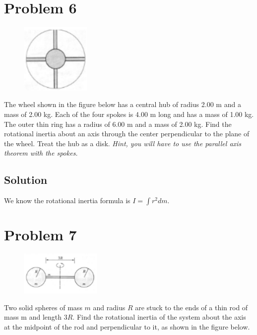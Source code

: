 \documentclass[12pt]{article}
\begin{document}
\section*{Problem 6}
\begin{figure}
    \vspace{-30pt}
    \includegraphics[width=0.30\textwidth]{graph_6.png} 
\end{figure}
The wheel shown in the figure below has a central hub of radius 2.00 m and a mass of 2.00
kg. Each of the four spokes is 4.00 m long and has a mass of 1.00 kg. The outer thin ring has a
radius of 6.00 m and a mass of 2.00 kg. Find the rotational inertia about an axis through the
center perpendicular to the plane of the wheel. Treat the hub as a disk. \textit{Hint, you will have to
use the parallel axis theorem with the spokes.}

\subsection*{Solution}
We know the rotational inertia formula is \(I = \int r^2 dm\).


\pagebreak
\section*{Problem 7}
\begin{figure}
    \vspace{-30pt}
    \includegraphics[width=0.35\textwidth]{graph_7.png} 
\end{figure}
Two solid spheres of mass $m$ and radius $R$ are stuck to the ends of a thin rod of mass m and
length $3R$. Find the rotational inertia of the system about the axis at the midpoint of the rod and
perpendicular to it, as shown in the figure below.
\end{document}
